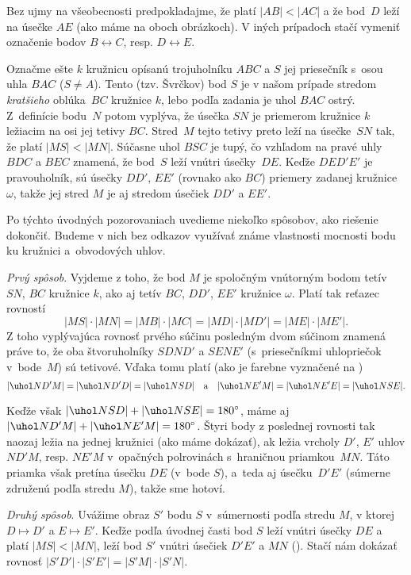 {%
Bez ujmy na všeobecnosti predpokladajme, že platí $|AB|<|AC|$ a že
bod~$D$ leží na úsečke $AE$ (ako máme na oboch obrázkoch).
V iných prípadoch stačí vymeniť označenie bodov $B\leftrightarrow C$,
resp. $D\leftrightarrow E$.

Označme ešte $k$ kružnicu opísanú trojuholníku $ABC$ a
$S$ jej priesečník s~osou uhla $BAC$ ($S\ne A$).
Tento (tzv. Švrčkov) bod $S$ je v našom prípade
stredom \emph{kratšieho} oblúka~$BC$ kružnice $k$,
lebo podľa zadania je uhol $BAC$ ostrý. Z~definície bodu~$N$
potom vyplýva, že úsečka $SN$ je priemerom kružnice $k$ ležiacim na osi
jej tetivy $BC$. Stred~$M$ tejto tetivy preto leží na úsečke~$SN$
tak, že platí $|MS|<|MN|$. Súčasne uhol $BSC$ je tupý,
čo vzhľadom na pravé uhly $BDC$ a $BEC$ znamená,
že bod~$S$ leží vnútri úsečky~$DE$.
Keďže $DED'E'$ je pravouholník, sú úsečky $DD'$, $EE'$ (rovnako
ako $BC$) priemery zadanej kružnice~$\omega$, takže jej stred $M$
je aj stredom úsečiek $DD'$ a $EE'$.

Po týchto úvodných pozorovaniach uvedieme niekoľko spôsobov, ako
riešenie dokončiť. Budeme v nich bez odkazov využívať
známe vlastnosti mocnosti bodu ku kružnici a~obvodových uhlov.

\medskip
\emph{Prvý spôsob}. Vyjdeme z toho, že bod $M$ je spoločným
vnútorným bodom tetív $SN$, $BC$ kružnice $k$, ako aj tetív
$BC$, $DD'$, $EE'$ kružnice $\omega$. Platí tak reťazec rovností
$$
|MS|\cdot|MN|=|MB|\cdot|MC|=|MD|\cdot |MD'|=|ME|\cdot |ME'|.
$$
Z toho vyplývajúca rovnosť prvého súčinu posledným dvom súčinom
znamená práve to, že oba štvoruholníky $SDND'$ a $SENE'$
(s~priesečníkmi uhlopriečok v~bode~$M$) sú tetivové.
Vďaka tomu platí (ako je farebne vyznačené na \obr)
$$
|\uhol ND'M|=|\uhol ND'D|=|\uhol NSD|\quad\hbox{a}\quad
|\uhol NE'M|=|\uhol NE'E|=|\uhol NSE|.
$$
%

Keďže však $|\uhol NSD|+|\uhol NSE|=180^\circ$, máme aj
$|\uhol ND'M|+|\uhol NE'M|=180^\circ$. Štyri body z poslednej
rovnosti tak naozaj ležia na jednej kružnici (ako máme dokázať),
ak ležia vrcholy $D'$, $E'$ uhlov $ND'M$, resp. $NE'M$
v~opačných polrovinách s~hraničnou priamkou~$MN$.
Táto priamka však pretína úsečku $DE$ (v~bode $S$), a~teda
aj úsečku~$D'E'$ (súmerne združenú podľa stredu $M$),
takže sme hotoví.

\medskip
\emph{Druhý spôsob}. Uvážime obraz $S'$ bodu $S$ v~súmernosti
podľa stredu $M$, v ktorej $D\mapsto D'$ a $E\mapsto E'$.
Keďže podľa úvodnej časti bod $S$ leží vnútri úsečky $DE$
a platí $|MS|<|MN|$, leží bod $S'$ vnútri úsečiek
$D'E'$ a $MN$ (\obr). Stačí nám dokázať rovnosť
$|S'D'|\cdot|S'E'|=|S'M|\cdot|S'N|$.
%

}
